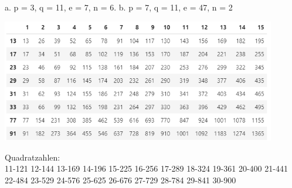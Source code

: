 \documentclass[landscape,twocolumn,a4paper]{article}
\begin{document}
a.  p = 3, q = 11,  e = 7, n = 6. \quad
b.  p = 7, q = 11, e = 47, n = 2 

\newpage

\includegraphics[width=12cm]{reihen.png}

Quadratzahlen: \\
11-121 12-144 13-169 14-196 15-225 16-256 17-289 18-324 19-361 20-400 
21-441 22-484 23-529 24-576 25-625 26-676 27-729 28-784 29-841 30-900 


\bigskip {}
\bigskip {}
\end{document}
